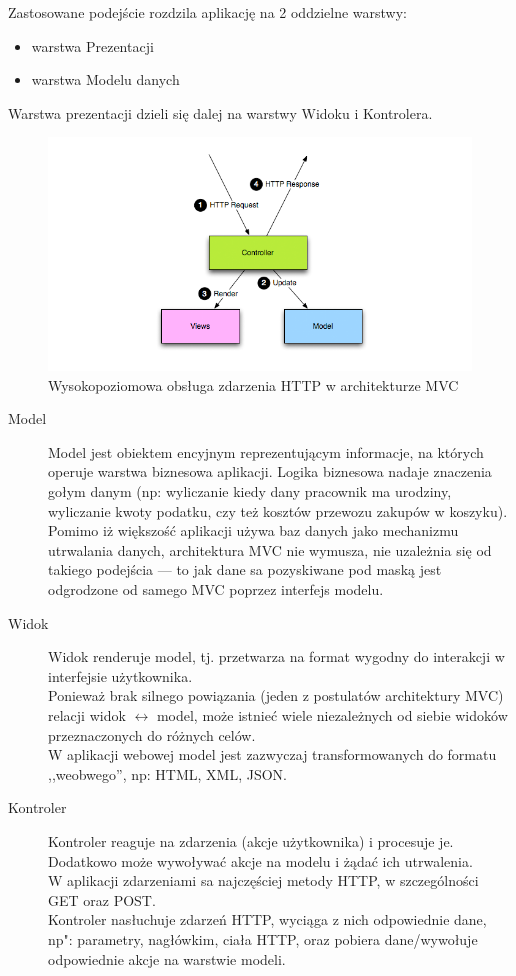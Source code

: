 \documentclass[a4paper,12pt,notitlepage]{mwrep}
\begin{document}
Zastosowane podejście rozdzila aplikację na 2 oddzielne warstwy:
\begin{itemize}
	\item	warstwa Prezentacji
	\item	warstwa Modelu danych
\end{itemize}
Warstwa prezentacji dzieli się dalej na warstwy Widoku i Kontrolera.

\begin{figure}[H]
\centering
\includegraphics[scale=0.7]{images/diagrams_mvc.png}
\caption{Wysokopoziomowa obsługa zdarzenia HTTP w architekturze MVC}
\label{fig:mvc_1}
\end{figure}

\begin{description}
	\item[Model]	Model jest obiektem encyjnym reprezentującym informacje, na których operuje warstwa biznesowa aplikacji.
		Logika biznesowa nadaje znaczenia gołym danym (np: wyliczanie kiedy dany pracownik ma urodziny,
		wyliczanie kwoty podatku, czy też kosztów przewozu zakupów w koszyku).\\
		Pomimo iż większość aplikacji używa baz danych jako mechanizmu utrwalania danych, architektura MVC nie wymusza,
		nie uzależnia się od takiego podejścia --- to jak dane sa pozyskiwane pod maską jest odgrodzone od samego MVC poprzez interfejs modelu.
	\item[Widok]	Widok renderuje model, tj. przetwarza na format wygodny do interakcji w interfejsie użytkownika.\\
		Ponieważ brak silnego powiązania (jeden z postulatów architektury MVC) relacji widok $\longleftrightarrow$ model,
		może istnieć wiele niezależnych od siebie widoków przeznaczonych do różnych celów.\\
		W aplikacji webowej model jest zazwyczaj transformowanych do formatu ,,weobwego'', np: HTML, XML, JSON.
	\item[Kontroler]	Kontroler reaguje na zdarzenia (akcje użytkownika) i procesuje je. Dodatkowo może wywoływać akcje
		na modelu i żądać ich utrwalenia.\\
		W aplikacji zdarzeniami sa najczęściej metody HTTP, w szczególności GET oraz POST.\\
		Kontroler nasłuchuje zdarzeń HTTP, wyciąga z nich odpowiednie dane, np": parametry, nagłówkim, ciała HTTP,
		oraz pobiera dane/wywołuje odpowiednie akcje na warstwie modeli.
\end{description}
\end{document}
